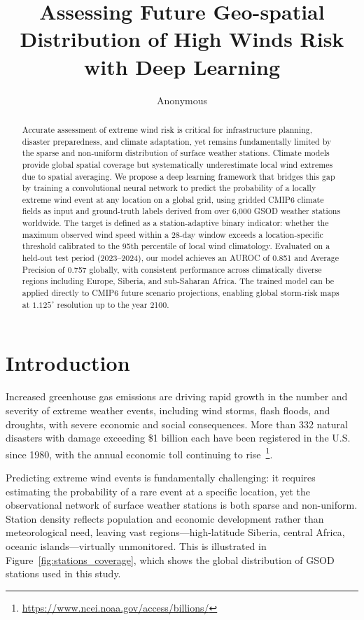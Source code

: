 \documentclass{article}
\title{Assessing Future Geo-spatial Distribution of High Winds Risk with Deep Learning}
\author{
    Anonymous
}
\begin{document}
\maketitle

\begin{abstract}
Accurate assessment of extreme wind risk is critical for infrastructure planning, disaster preparedness, and climate adaptation, yet remains fundamentally limited by the sparse and non-uniform distribution of surface weather stations. Climate models provide global spatial coverage but systematically underestimate local wind extremes due to spatial averaging. We propose a deep learning framework that bridges this gap by training a convolutional neural network to predict the probability of a locally extreme wind event at any location on a global grid, using gridded CMIP6 climate fields as input and ground-truth labels derived from over 6{,}000 GSOD weather stations worldwide. The target is defined as a station-adaptive binary indicator: whether the maximum observed wind speed within a 28-day window exceeds a location-specific threshold calibrated to the 95th percentile of local wind climatology. Evaluated on a held-out test period (2023--2024), our model achieves an AUROC of 0.851 and Average Precision of 0.757 globally, with consistent performance across climatically diverse regions including Europe, Siberia, and sub-Saharan Africa. The trained model can be applied directly to CMIP6 future scenario projections, enabling global storm-risk maps at $1.125^\circ$ resolution up to the year 2100.
\end{abstract}

\section{Introduction}
\label{sec:intro}

Increased greenhouse gas emissions are driving rapid growth in the number and severity of extreme weather events, including wind storms, flash floods, and droughts, with severe economic and social consequences. More than 332 natural disasters with damage exceeding \$1 billion each have been registered in the U.S. since 1980, with the annual economic toll continuing to rise~\footnote{\url{https://www.ncei.noaa.gov/access/billions/}}.

Predicting extreme wind events is fundamentally challenging: it requires estimating the probability of a rare event at a specific location, yet the observational network of surface weather stations is both sparse and non-uniform. Station density reflects population and economic development rather than meteorological need, leaving vast regions---high-latitude Siberia, central Africa, oceanic islands---virtually unmonitored. This is illustrated in Figure~\ref{fig:stations_coverage}, which shows the global distribution of GSOD stations used in this study.
\end{document}
